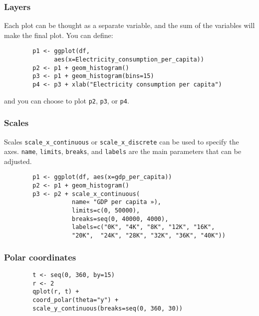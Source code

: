 \documentclass{beamer}
\begin{document}
	\begin{frame}[fragile]
		\frametitle{Layers}

		Each plot can be thought as a separate variable, and the sum of the variables will make the final plot. You can define:

		\begin{exampleblock}{}
		\begin{center}
		\begin{BVerbatim}
		p1 <- ggplot(df,
		      aes(x=Electricity_consumption_per_capita))
		p2 <- p1 + geom_histogram()
		p3 <- p1 + geom_histogram(bins=15)
		p4 <- p3 + xlab("Electricity consumption per capita")
		\end{BVerbatim}
		\end{center}
		\end{exampleblock}{}

		and you can choose to plot \verb|p2|, \verb|p3|, or \verb|p4|.

	\end{frame}

	\begin{frame}[fragile]
		\frametitle{Scales}

		Scales \verb|scale_x_continuous| or \verb|scale_x_discrete| can be used to specify the axes. \verb|name|, \verb|limits|, \verb|breaks|, and \verb|labels| are the main parameters that can be adjusted.

		\begin{exampleblock}{}
		\begin{center}
		\begin{BVerbatim}
		p1 <- ggplot(df, aes(x=gdp_per_capita))
		p2 <- p1 + geom_histogram()
		p3 <- p2 + scale_x_continuous(
		           name« "GDP per capita »),
		           limits=c(0, 50000),
		           breaks=seq(0, 40000, 4000),
		           labels=c("0K", "4K", "8K", "12K", "16K",
		           "20K",  "24K", "28K", "32K", "36K", "40K"))
		\end{BVerbatim}
		\end{center}
		\end{exampleblock}{}

	\end{frame}

	\begin{frame}[fragile]
		\frametitle{Polar coordinates}

		\begin{exampleblock}{}
		\begin{center}
		\begin{BVerbatim}
		t <- seq(0, 360, by=15)
		r <- 2
		qplot(r, t) +
		coord_polar(theta="y") +
		scale_y_continuous(breaks=seq(0, 360, 30))
		\end{BVerbatim}
		\end{center}
		\end{exampleblock}{}

	\end{frame}
\end{document}
